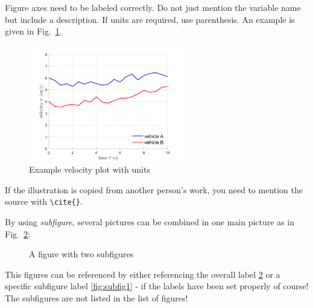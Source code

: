 Figure axes need to be labeled correctly. Do not just mention the variable name but include a description. If units are required, use parenthesis. An example is given in Fig.~\ref{fig:vel_plot}.

\begin{figure}[htb]
\centering
\includegraphics[width=0.6\textwidth]{pics/velocity_plot.png}
\caption{Example velocity plot with units}
\label{fig:vel_plot}
\end{figure}

If the illustration is copied from another person's work, you need to mention the
source with \verb|\cite{}|.

By using \textit{subfigure}, several pictures can be combined in one main picture as in Fig.~\ref{fig:OverallPic}:

\begin{figure}[htb]
\centering
{}
\quad %

\caption[Abbrev. Descr. of subfigure-figure]{A figure with two subfigures}
\label{fig:OverallPic}
\end{figure}

This figures can be referenced by either referencing the overall label \ref{fig:OverallPic} or a specific subfigure label \ref{fig:subfig1} - if the labels have been set properly of course! The subfigures are not listed in the list of figures!



